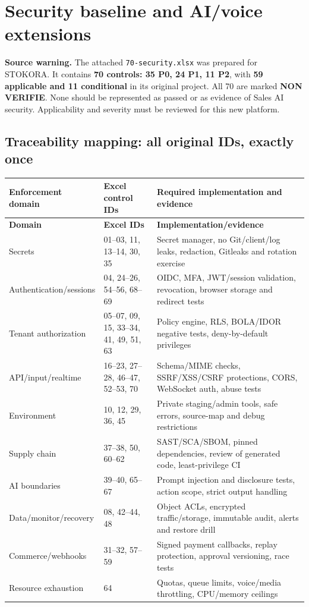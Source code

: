 \documentclass[10.5pt,a4paper,oneside]{article}
\begin{document}
\section{Security baseline and AI/voice extensions}
\begin{riskbox}
\textbf{Source warning.} The attached \texttt{70-security.xlsx} was prepared for STOKORA. It contains \textbf{70 controls: 35 P0, 24 P1, 11 P2}, with \textbf{59 applicable and 11 conditional} in its original project. All 70 are marked \textbf{NON VERIFIE}. None should be represented as passed or as evidence of Sales AI security. Applicability and severity must be reviewed for this new platform.
\end{riskbox}
\subsection{Traceability mapping: all original IDs, exactly once}
\small
\begin{longtable}{@{}L{38mm}L{46mm}L{77mm}@{}}
\toprule{}\textbf{Enforcement domain} & \textbf{Excel control IDs} & \textbf{Required implementation and evidence}\\\midrule
\endfirsthead\toprule{}\textbf{Domain} & \textbf{Excel IDs} & \textbf{Implementation/evidence}\\\midrule\endhead
Secrets & 01--03, 11, 13--14, 30, 35 & Secret manager, no Git/client/log leaks, redaction, Gitleaks and rotation exercise\\
Authentication/sessions & 04, 24--26, 54--56, 68--69 & OIDC, MFA, JWT/session validation, revocation, browser storage and redirect tests\\
Tenant authorization & 05--07, 09, 15, 33--34, 41, 49, 51, 63 & Policy engine, RLS, BOLA/IDOR negative tests, deny-by-default privileges\\
API/input/realtime & 16--23, 27--28, 46--47, 52--53, 70 & Schema/MIME checks, SSRF/XSS/CSRF protections, CORS, WebSocket auth, abuse tests\\
Environment & 10, 12, 29, 36, 45 & Private staging/admin tools, safe errors, source-map and debug restrictions\\
Supply chain & 37--38, 50, 60--62 & SAST/SCA/SBOM, pinned dependencies, review of generated code, least-privilege CI\\
AI boundaries & 39--40, 65--67 & Prompt injection and disclosure tests, action scope, strict output handling\\
Data/monitor/recovery & 08, 42--44, 48 & Object ACLs, encrypted traffic/storage, immutable audit, alerts and restore drill\\
Commerce/webhooks & 31--32, 57--59 & Signed payment callbacks, replay protection, approval versioning, race tests\\
Resource exhaustion & 64 & Quotas, queue limits, voice/media throttling, CPU/memory ceilings\\
\bottomrule
\end{longtable}\normalsize
\end{document}

